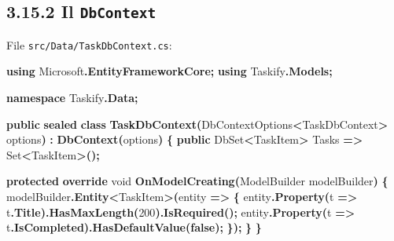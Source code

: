 \documentclass[
  italian,
  10pt,
]{book}
\newenvironment{Shaded}{\begin{snugshade}}{\end{snugshade}}
\newcommand{\DataTypeTok}[1]{\textcolor[rgb]{0.13,0.29,0.53}{#1}}
\newcommand{\DecValTok}[1]{\textcolor[rgb]{0.00,0.00,0.81}{#1}}
\newcommand{\FunctionTok}[1]{\textcolor[rgb]{0.13,0.29,0.53}{\textbf{#1}}}
\newcommand{\KeywordTok}[1]{\textcolor[rgb]{0.13,0.29,0.53}{\textbf{#1}}}
\newcommand{\NormalTok}[1]{#1}
\newcommand{\OperatorTok}[1]{\textcolor[rgb]{0.81,0.36,0.00}{\textbf{#1}}}
\begin{document}
\subsection{\texorpdfstring{3.15.2 Il
\texttt{DbContext}}{3.15.2 Il DbContext}}\label{il-dbcontext-2}

File \texttt{src/Data/TaskDbContext.cs}:

\begin{Shaded}
\begin{Highlighting}[]
\KeywordTok{using}\NormalTok{ Microsoft}\OperatorTok{.}\FunctionTok{EntityFrameworkCore}\OperatorTok{;}
\KeywordTok{using}\NormalTok{ Taskify}\OperatorTok{.}\FunctionTok{Models}\OperatorTok{;}

\KeywordTok{namespace}\NormalTok{ Taskify}\OperatorTok{.}\FunctionTok{Data}\OperatorTok{;}

\KeywordTok{public} \KeywordTok{sealed} \KeywordTok{class} \FunctionTok{TaskDbContext}\OperatorTok{(}\NormalTok{DbContextOptions}\OperatorTok{\textless{}}\NormalTok{TaskDbContext}\OperatorTok{\textgreater{}}\NormalTok{ options}\OperatorTok{)}
    \OperatorTok{:} \FunctionTok{DbContext}\OperatorTok{(}\NormalTok{options}\OperatorTok{)}
\OperatorTok{\{}
    \KeywordTok{public}\NormalTok{ DbSet}\OperatorTok{\textless{}}\NormalTok{TaskItem}\OperatorTok{\textgreater{}}\NormalTok{ Tasks }\OperatorTok{=\textgreater{}}\NormalTok{ Set}\OperatorTok{\textless{}}\NormalTok{TaskItem}\OperatorTok{\textgreater{}();}

    \KeywordTok{protected} \KeywordTok{override} \DataTypeTok{void} \FunctionTok{OnModelCreating}\OperatorTok{(}\NormalTok{ModelBuilder modelBuilder}\OperatorTok{)}
    \OperatorTok{\{}
\NormalTok{        modelBuilder}\OperatorTok{.}\FunctionTok{Entity}\OperatorTok{\textless{}}\NormalTok{TaskItem}\OperatorTok{\textgreater{}(}\NormalTok{entity }\OperatorTok{=\textgreater{}}
        \OperatorTok{\{}
\NormalTok{            entity}\OperatorTok{.}\FunctionTok{Property}\OperatorTok{(}\NormalTok{t }\OperatorTok{=\textgreater{}}\NormalTok{ t}\OperatorTok{.}\FunctionTok{Title}\OperatorTok{).}\FunctionTok{HasMaxLength}\OperatorTok{(}\DecValTok{200}\OperatorTok{).}\FunctionTok{IsRequired}\OperatorTok{();}
\NormalTok{            entity}\OperatorTok{.}\FunctionTok{Property}\OperatorTok{(}\NormalTok{t }\OperatorTok{=\textgreater{}}\NormalTok{ t}\OperatorTok{.}\FunctionTok{IsCompleted}\OperatorTok{).}\FunctionTok{HasDefaultValue}\OperatorTok{(}\KeywordTok{false}\OperatorTok{);}
        \OperatorTok{\});}
    \OperatorTok{\}}
\OperatorTok{\}}
\end{Highlighting}
\end{Shaded}
\end{document}
